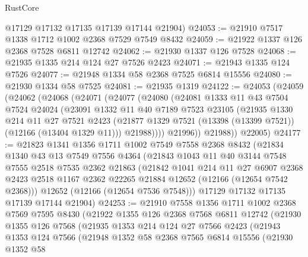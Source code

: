 \begin{lexlean}{RustCore}
\begin{coremodule}
      @17129
      @17132
      @17135
      @17139
      @17144
      @21904)
@24053 := @21910 @7517 @1338 @1712 @1002 @2368 @7529 @7549 @8432
@24059 := @21922 @1337 @126 @2368 @7528 @6811 @12742
@24062 := @21930 @1337 @126 @7528
@24068 := @21935 @1335 @214 @124 @27 @7526 @2423
@24071 := @21943 @1335 @124 @7526
@24077 := @21948 @1334 @58 @2368 @7525 @6814 @15556
@24080 := @21930 @1334 @58 @7525
@24081 := @21935 @1319
@24122 := @24053
    (@24059
      (@24062
        (@24068
          (@24071
            (@24077
              (@24080
                (@24081
                  @1333
                  @11
                  @43
                  @7504
                  @7524
                  @24024
                  (@23091
                    @1332
                    @11
                    @40
                    @7189
                    @7523
                    @23105
                    (@21935
                      @1330
                      @214
                      @11
                      @27
                      @7521
                      @2423
                      (@21877 @1329 @7521 (@13398 (@13399 @7521)) (@12166 (@13404 @1329 @11)))
                      @21988))))
              @21996))
          @21988))
      @22005)
@24177 := @21823
    @1341
    @1356
    @1711
    @1002
    @7549
    @7558
    @2368
    @8432
    (@21834
      @1340
      @43
      @13
      @7549
      @7556
      @4364
      (@21843
        @1043
        @11
        @40
        @3144
        @7548
        @7555
        @2518
        @7535
        @2362
        @21863
        (@21842
          @1041
          @214
          @11
          @27
          @6907
          @2368
          @2423
          @2518
          @1167
          @2362
          @22265
          @21884
          @12652
          (@12166 (@12654 @7542 @2368)))
        @12652
        (@12166 (@12654 @7536 @7548)))
      @17129
      @17132
      @17135
      @17139
      @17144
      @21904)
@24253 := @21910
    @7558
    @1356
    @1711
    @1002
    @2368
    @7569
    @7595
    @8430
    (@21922
      @1355
      @126
      @2368
      @7568
      @6811
      @12742
      (@21930
        @1355
        @126
        @7568
        (@21935
          @1353
          @214
          @124
          @27
          @7566
          @2423
          (@21943
            @1353
            @124
            @7566
            (@21948
              @1352
              @58
              @2368
              @7565
              @6814
              @15556
              (@21930
                @1352
                @58

\end{coremodule}
\end{lexlean}
